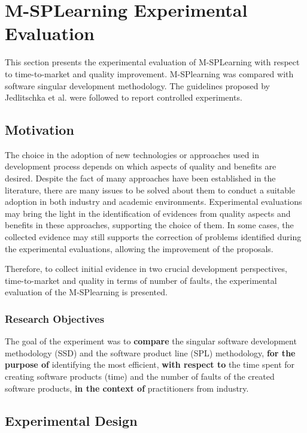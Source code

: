 \section{M-SPLearning Experimental Evaluation}\label{section4}

This section presents the experimental evaluation of M-SPLearning with respect to time-to-market and quality improvement. M-SPlearning was compared with software singular development methodology. The guidelines proposed by Jedlitschka et al. \cite{jedlitschka07} were followed to report controlled experiments.

\subsection{Motivation}\label{sub:motivation}


The choice in the adoption of new technologies or approaches used in development process depends on which aspects of quality and benefits are desired. Despite the fact of many approaches have been established in the literature, there are many issues to be solved about them to conduct a suitable adoption in both industry and academic environments. Experimental evaluations may bring the light in the identification of evidences from quality aspects and benefits in these approaches, supporting the choice of them. In some cases, the collected evidence may still supports the correction of problems identified during the experimental evaluations, allowing the improvement of the proposals.

Therefore, to collect initial evidence in two crucial development perspectives, time-to-market and quality in terms of number of faults, the experimental evaluation of the M-SPlearning is presented.

\subsubsection{Research Objectives}\label{sub:object}

The goal of the experiment was to \textbf{compare} the singular software development methodology (SSD) and the software product line (SPL) methodology, \textbf{for the purpose of} identifying the most efficient, \textbf{with respect to} the time spent for creating software products (time) and the number of faults of the created software products, \textbf{in the context of} practitioners from industry.


\subsection{Experimental Design}\label{sub:design}

